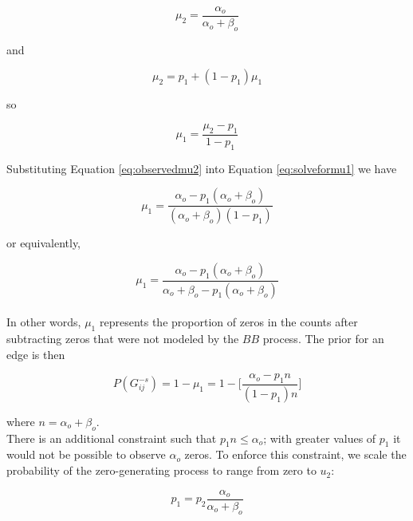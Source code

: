 \documentclass[12pt]{article}
\begin{document}
\begin{equation}
    \label{eq:observedmu2}
    \mu_2 = \frac{\alpha_o}{\alpha_o + \beta_o}
\end{equation}

\noindent
and

\begin{equation}
    \label{eq:mus}
    \mu_2 = p_1 + (1-p_1)\mu_1
\end{equation}

\noindent
so

\begin{equation}
    \label{eq:solveformu1}
    \mu_1  = \frac{\mu_2 - p_1}{1 - p_1}
\end{equation}

\noindent
Substituting Equation \ref{eq:observedmu2} into Equation \ref{eq:solveformu1} we have

\begin{equation}
    \mu_1 = \frac{\alpha_o - p_1(\alpha_o + \beta_o)}{(\alpha_o + \beta_o)(1 - p_1)}
\end{equation}

\noindent
or equivalently,

\begin{equation}
    \mu_1 = \frac{\alpha_o - p_1(\alpha_o + \beta_o)}{\alpha_o + \beta_o - p_1(\alpha_o + \beta_o)}
\end{equation} \\ 

In other words, $\mu_1$ represents the proportion of zeros in the counts after subtracting zeros that were not modeled by the $BB$ process. The prior for an edge is then

\begin{equation}
    \label{eq:priorwp1}
    P(G^{-s}_{ij}) = 1 - \mu_1 = 1 - \Bigg[\frac{\alpha_o - p_1n}{(1 - p_1)n}\Bigg]
\end{equation}

\noindent
where $n = \alpha_o + \beta_o$. \\

There is an additional constraint such that $p_1n \leq \alpha_o$; with greater values of $p_1$ it would not be possible to observe $\alpha_o$ zeros. To enforce this constraint, we scale the probability of the zero-generating process to range from zero to $u_2$:

\begin{equation}
    \label{eq:p1}
    p_1 = p_2 \frac{\alpha_o}{\alpha_o + \beta_o}
\end{equation}
\end{document}
